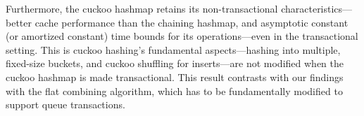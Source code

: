 Furthermore, the cuckoo hashmap retains its non-transactional characteristics--- better cache performance than the chaining hashmap, and asymptotic constant (or amortized constant) time bounds for its operations---even in the transactional setting. This is cuckoo hashing's fundamental aspects---hashing into multiple, fixed-size buckets, and cuckoo shuffling for inserts---are not modified when the cuckoo hashmap is made transactional. This result contrasts with our findings with the flat combining algorithm, which has to be fundamentally modified to support queue transactions.

